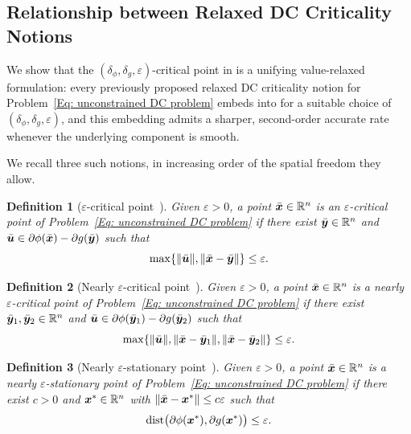 \documentclass[english]{article}
\newtheorem{definition}{Definition}[section]
\begin{document}

\subsection{Relationship between Relaxed DC Criticality Notions}
\label{sec:relationship-relaxed-dc-criticality}

We show that the $(\delta_\phi,\delta_g,\varepsilon)$-critical point in
 is a unifying value-relaxed formulation:
every previously proposed relaxed DC criticality notion for
Problem~\eqref{Eq: unconstrained DC problem} embeds into
 for a suitable choice of
$(\delta_\phi,\delta_g,\varepsilon)$, and this embedding admits a sharper,
second-order accurate rate whenever the underlying component is smooth.

We recall three such notions, in increasing order of the spatial freedom
they allow.

\begin{definition}[$\varepsilon$-critical point~\citep{moudafi2021complete,sun2023algorithms}]
\label{Def: epsilon-critical point in DC}
Given $\varepsilon>0$, a point $\bar{\bm{x}}\in\mathbb{R}^n$ is an $\varepsilon$-critical
point of Problem~\eqref{Eq: unconstrained DC problem} if there exist
$\bar{\bm{y}}\in\mathbb{R}^n$ and $\bar{\bm{u}}\in\partial\phi(\bar{\bm{x}})-\partial g(\bar{\bm{y}})$
such that
\[
    \max\limits\{\|\bar{\bm{u}}\|,\|\bar{\bm{x}}-\bar{\bm{y}}\|\}\le\varepsilon .
\]
\end{definition}

\begin{definition}[Nearly $\varepsilon$-critical point~\citep{yao2022large}]
\label{Def: epsilon-critical point 3}
Given $\varepsilon>0$, a point $\bar{\bm{x}}\in\mathbb{R}^n$ is a nearly
$\varepsilon$-critical point of Problem~\eqref{Eq: unconstrained DC problem}
if there exist $\bar{\bm{y}}_1,\bar{\bm{y}}_2\in\mathbb{R}^n$ and
$\bar{\bm{u}}\in\partial\phi(\bar{\bm{y}}_1)-\partial g(\bar{\bm{y}}_2)$ such that
\[
    \max\limits\{\|\bar{\bm{u}}\|,\|\bar{\bm{x}}-\bar{\bm{y}}_1\|,\|\bar{\bm{x}}-\bar{\bm{y}}_2\|\}
    \le\varepsilon .
\]
\end{definition}

\begin{definition}[Nearly $\varepsilon$-stationary point~\citep{xu2019stochastic}]
\label{def:xu-near-stationary}
Given $\varepsilon>0$, a point $\bar{\bm{x}}\in\mathbb{R}^n$ is a nearly
$\varepsilon$-stationary point of Problem~\eqref{Eq: unconstrained DC
problem} if there exist $c>0$ and $\bm{x}^*\in\mathbb{R}^n$ with
$\|\bar{\bm{x}}-\bm{x}^*\|\le c\varepsilon$ such that
\[
    \operatorname{dist}\bigl(\partial\phi(\bm{x}^*),\partial g(\bm{x}^*)\bigr)
    \le\varepsilon .
\]
\end{definition}
\end{document}
